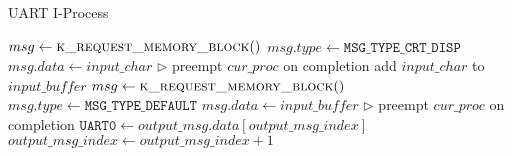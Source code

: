 \documentclass[12pt]{report}
\begin{document}
\begin{algorithm}
\caption{UART I-Process}
\label{alg:uartiprocess}
\begin{algorithmic}[1]
         
            \State $msg \leftarrow \Call{k\_request\_memory\_block}{\null}$
            \State $msg.type \leftarrow \texttt{MSG_TYPE_CRT_DISP}$
            \State $msg.data \leftarrow input\_char$
            \State {}
            \State $\triangleright$ preempt $cur\_proc$ on completion
        \EndIf
                \State add $input\_char$ to $\mathit{input\_buffer}$
            \Else
                \State $msg \leftarrow \Call{k\_request\_memory\_block}{\null}$
                \State $msg.type \leftarrow \texttt{MSG_TYPE_DEFAULT}$
                \State $msg.data \leftarrow \mathit{input\_buffer}$
                \State {} 
                \State $\triangleright$ preempt $cur\_proc$ on completion
            \EndIf
        \State $\texttt{UART0} \leftarrow output\_msg.data[output\_msg\_index]$
        \State $output\_msg\_index \leftarrow output\_msg\_index + 1$
    \EndIf
\EndProcedure
\end{algorithmic}
\end{algorithm}
\end{document}
